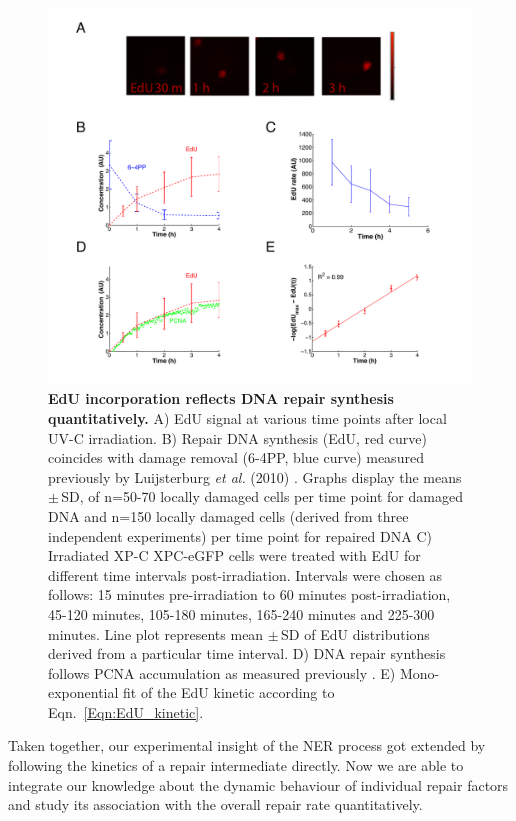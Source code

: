 \begin{figure}[b!]
\begin{center}
\includegraphics[width=1\textwidth]{Abbildungen/figure2_4.pdf}
\caption{\textbf{EdU incorporation reflects DNA repair synthesis quantitatively.} A) EdU signal at various time points after local UV-C irradiation. B) Repair DNA synthesis (EdU, red curve) coincides with damage removal (6-4PP, blue curve) measured previously by Luijsterburg \textit{et al.} (2010) \cite{Luijsterburg2010}. Graphs display the means $\pm$\,SD, of n=50-70 locally damaged cells per time point for damaged DNA and n=150 locally damaged cells (derived from three independent experiments) per time point for repaired DNA C) Irradiated XP-C XPC-eGFP cells were treated with EdU for different time intervals post-irradiation. Intervals were chosen as follows: 15 minutes pre-irradiation to 60 minutes post-irradiation, 45-120 minutes, 105-180 minutes, 165-240 minutes and 225-300 minutes. Line plot represents mean $\pm$\,SD of EdU distributions derived from a particular time interval. D) DNA repair synthesis follows PCNA accumulation as measured previously \cite{Luijsterburg2010}. E) Mono-exponential fit of the EdU kinetic according to Eqn.\ \ref{Eqn:EdU_kinetic}.}
\label{fig:DNArepairKinetic}
%
%
\end{center}
\end{figure}
Taken together, our experimental insight of the NER process got extended by following the kinetics of a repair intermediate directly. Now we are able to integrate our knowledge about the dynamic behaviour of individual repair factors and study its association with the overall repair rate quantitatively.    